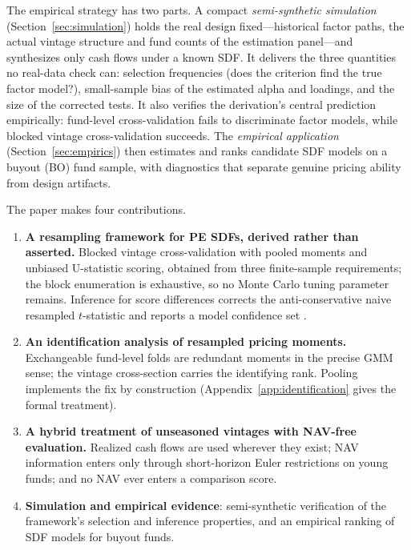 \documentclass[11pt]{article}
\begin{document}
The empirical strategy has two parts. A compact \emph{semi-synthetic simulation} (Section~\ref{sec:simulation}) holds the real design fixed---historical factor paths, the actual vintage structure and fund counts of the estimation panel---and synthesizes only cash flows under a known SDF. It delivers the three quantities no real-data check can: selection frequencies (does the criterion find the true factor model?), small-sample bias of the estimated alpha and loadings, and the size of the corrected tests. It also verifies the derivation's central prediction empirically: fund-level cross-validation fails to discriminate factor models, while blocked vintage cross-validation succeeds. The \emph{empirical application} (Section~\ref{sec:empirics}) then estimates and ranks candidate SDF models on a buyout (BO) fund sample, with diagnostics that separate genuine pricing ability from design artifacts.

The paper makes four contributions.
\begin{enumerate}
\item \textbf{A resampling framework for PE SDFs, derived rather than asserted.} Blocked vintage cross-validation with pooled moments and unbiased U-statistic scoring, obtained from three finite-sample requirements; the block enumeration is exhaustive, so no Monte Carlo tuning parameter remains. Inference for score differences corrects the anti-conservative naive resampled \(t\)-statistic \citep{BengioGrandvalet2004,NadeauBengio2003} and reports a model confidence set \citep{HansenLundeNason2011}.
\item \textbf{An identification analysis of resampled pricing moments.} Exchangeable fund-level folds are redundant moments in the precise GMM sense; the vintage cross-section carries the identifying rank. Pooling implements the fix by construction (Appendix~\ref{app:identification} gives the formal treatment).
\item \textbf{A hybrid treatment of unseasoned vintages with NAV-free evaluation.} Realized cash flows are used wherever they exist; NAV information enters only through short-horizon Euler restrictions on young funds; and no NAV ever enters a comparison score.
\item \textbf{Simulation and empirical evidence}: semi-synthetic verification of the framework's selection and inference properties, and an empirical ranking of SDF models for buyout funds.
\end{enumerate}
\end{document}
